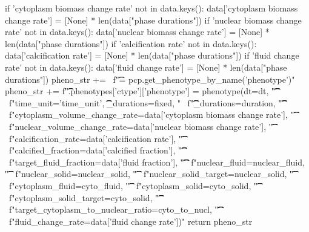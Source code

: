 \begin{python}
                if 'cytoplasm biomass change rate' not in data.keys():
                    data['cytoplasm biomass change rate'] = [None] * len(data["phase durations"])
                if 'nuclear biomass change rate' not in data.keys():
                    data['nuclear biomass change rate'] = [None] * len(data["phase durations"])
                if 'calcification rate' not in data.keys():
                    data['calcification rate'] = [None] * len(data["phase durations"])
                if 'fluid change rate' not in data.keys():
                    data['fluid change rate'] = [None] * len(data["phase durations"])
                pheno_str += \
                    f"\t\t\tphenotype = pcp.get_phenotype_by_name('{phenotype}')\n"
                pheno_str += f"\t\t\tself.phenotypes['{ctype}']['{phenotype}'] = phenotype(dt=dt, \n\t\t\t\t" \
                 f"time_unit='{time_unit}', \n\t\t\t\tfixed_durations={fixed},  " \
                 f"\n\t\t\t\tphase_durations={duration}, \n\t\t\t\t" \
                 f"cytoplasm_volume_change_rate={data['cytoplasm biomass change rate']}, \n\t\t\t\t" \
                 f"nuclear_volume_change_rate={data['nuclear biomass change rate']}, \n\t\t\t\t" \
                 f"calcification_rate={data['calcification rate']}, \n\t\t\t\t" \
                 f"calcified_fraction={data['calcified fraction']}, \n\t\t\t\t" \
                 f"target_fluid_fraction={data['fluid fraction']}, \n\t\t\t\t" \
                 f"nuclear_fluid={nuclear_fluid}, \n\t\t\t\t" \
                 f"nuclear_solid={nuclear_solid}, \n\t\t\t\t" \
                 f"nuclear_solid_target={nuclear_solid}, \n\t\t\t\t" \
                 f"cytoplasm_fluid={cyto_fluid}, \n\t\t\t\t" \
                 f"cytoplasm_solid={cyto_solid}, \n\t\t\t\t" \
                 f"cytoplasm_solid_target={cyto_solid}, \n\t\t\t\t" \
                 f"target_cytoplasm_to_nuclear_ratio={cyto_to_nucl}, \n\t\t\t\t" \
                 f"fluid_change_rate={data['fluid change rate']})\n"
    return pheno_str
\end{python}
